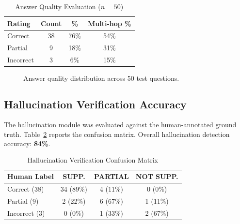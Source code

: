 \documentclass[conference]{IEEEtran}
\begin{document}
\begin{table}[h]
\caption{Answer Quality Evaluation ($n=50$)}
\label{tab:quality}
\centering
\begin{tabular}{lccc}
\toprule
\textbf{Rating} & \textbf{Count} & \textbf{\%} & \textbf{Multi-hop \%} \\
\midrule
Correct   & 38 & 76\% & 54\% \\
Partial   & 9  & 18\% & 31\% \\
Incorrect & 3  &  6\% & 15\% \\
\bottomrule
\end{tabular}
\end{table}

\begin{figure}[h]
\centering
{}
\caption{Answer quality distribution across 50 test questions.}
\label{fig:quality}
\end{figure}

\subsection{Hallucination Verification Accuracy}
The hallucination module was evaluated against the human-annotated
ground truth.
Table~\ref{tab:halluc} reports the confusion matrix.
Overall hallucination detection accuracy: \textbf{84\%}.

\begin{table}[h]
\caption{Hallucination Verification Confusion Matrix}
\label{tab:halluc}
\centering
\begin{tabular}{lccc}
\toprule
\textbf{Human Label} & \textbf{SUPP.} & \textbf{PARTIAL} & \textbf{NOT SUPP.} \\
\midrule
Correct (38)   & 34 (89\%) & 4 (11\%) & 0 (0\%)  \\
Partial (9)    & 2 (22\%)  & 6 (67\%) & 1 (11\%) \\
Incorrect (3)  & 0 (0\%)   & 1 (33\%) & 2 (67\%) \\
\bottomrule
\end{tabular}
\end{table}
\end{document}
